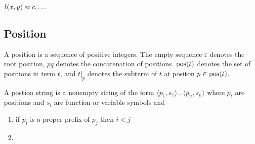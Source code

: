 \documentclass[ 
xcolor={usenames,dvipsnames,svgnames,tablem} 
,handout
]{beamer}
\begin{document}
\begin{frame}
${\mathsf f}(x,y)\approx c, \ldots$
\end{frame}


\subsection{Position}
\begin{frame}
\begin{definition}
A position is a sequence of positive integers.
The empty sequence $\varepsilon$ denotes the root position,
$pq$ denotes the concatenation of positions. 
$\operatorname{pos}(t)$ denotes the set of positions in term $t$, and $t|_p$ denotes the subterm of $t$ at positon $p\in\operatorname{pos}(t)$.
\end{definition}

\begin{definition}
A postion string is a nonempty string of the form $\langle p_1,s_1\rangle\ldots\langle p_n,s_n\rangle$
where $p_i$ are positions and $s_i$ are function or variable symbols and
\begin{enumerate}
\item
if $p_i$ is a proper prefix of $p_j$ then $i<j$
\item
\end{enumerate}
\end{definition}
\end{frame}
\end{document}
